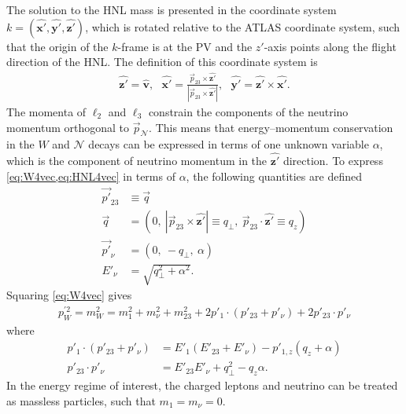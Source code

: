 The solution to the HNL mass is presented in the coordinate system $k = (\bm{\hat{x'}}, \bm{\hat{y'}}, \bm{\hat{z'}})$, which is rotated relative to the ATLAS coordinate system, such that the origin of the $k$-frame is at the PV and the $z'$-axis points along the flight direction of the HNL. The definition of this coordinate system is
\begin{align}
\bm{\hat{z'}} = \bm{\hat{v}}, \ \ \ \bm{\hat{x'}} = \frac{\vec{p}_{23} \times \bm{\hat{z'}}}{|\vec{p}_{23} \times \bm{\hat{z'}}|}, \ \ \ \bm{\hat{y'}} = \bm{\hat{z'}} \times \bm{\hat{x'}}. \nonumber
\end{align}
%
The momenta of $\ell_2$ and $\ell_3$ constrain the components of the neutrino momentum orthogonal to $\vec{p}_{\mathcal{N}}$. This means that energy--momentum conservation in the $W$ and $\mathcal{N}$ decays can be expressed in terms of one unknown variable $\alpha$, which is the component of neutrino momentum in the $\bm{\hat{z'}}$ direction.
To express \cref{eq:W4vec,eq:HNL4vec} in terms of $\alpha$, the following quantities are defined
\begin{align}
\vec{p'}_{23} &\equiv \vec{q} \label{eq:q_def_1} \\
\vec{q}_{\:\:} &= (0,\: |\vec{p}_{23} \times \bm{\hat{z'}}| \equiv q_{\perp},\: \vec{p}_{23} \cdot \bm{\hat{z'}} \equiv q_{z}) \label{eq:q_def_2} \\
\vec{p'}_\nu &=( 0,\: -q_{\perp}, \: \alpha)  \label{eq:q_def_3} \\
E'_\nu &= \sqrt{q_{\perp}^2+\alpha^2}. \label{eq:alpha_E}
\end{align}
%
Squaring \cref{eq:W4vec} gives
\begin{align}
p^{'2}_W  = m_W^2 = m_1^2 + m_\nu^2 + m_{23}^2  + 2p'_1 \cdot (p'_{23}+ p'_\nu) + 2 p'_{23} \cdot p'_\nu \label{eq:w_mass} 
\end{align}
%
where
%
\begin{align}
p'_1 \cdot (p'_{23}+ p'_\nu) &= E'_1 (E'_{23}+ E'_\nu) - p'_{1,z}(q_z + \alpha)  \nonumber \\   %
p'_{23} \cdot p'_\nu &= E'_{23}E'_\nu + q_{\perp}^2 - q_z\alpha.  \nonumber  %
\end{align}
%
In the energy regime of interest, the charged leptons and neutrino can be treated as massless particles, such that $m_1 = m_\nu = 0$. 
